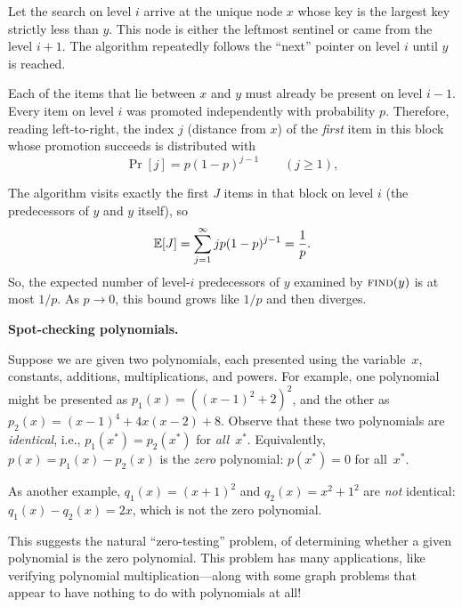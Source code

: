 \documentclass[11pt,addpoints,answers]{exam}
\begin{document}
\begin{questions}
\begin{parts}
    
    \begin{solution}
    Let the search on level \(i\) arrive at the unique node \(x\) whose key is the largest key strictly less than \(y\). This node is either the leftmost sentinel or came from the level \(i+1\).
    The algorithm repeatedly follows the “next'' pointer on level \(i\) until \(y\) is reached.
    
    Each of the items that lie between \(x\) and \(y\) must already be present on level \(i-1\). Every item on level \(i\) was promoted independently with probability \(p\). Therefore, reading left-to-right, the index \(j\) (distance from $x$) of the \emph{first} item in this block whose promotion succeeds is distributed with
    \[
        \Pr[j]=p(1-p)^{j-1}\qquad(j\ge 1),
    \]
    
    The algorithm visits exactly the first \(J\) items in that block on
    level \(i\) (the predecessors of \(y\) and \(y\) itself), so
    \[
        \operatorname*{\mathbb{E}}[J]=\sum_{j=1}^{\infty}jp(1-p)^{j-1}=\frac{1}{p}.
    \]
    So, the expected number of level-\(i\) predecessors of \(y\) examined by \(\textsc{find}(y)\) is at most \(1/p\).
    As \(p\to 0\), this bound grows like \(1/p\) and then diverges.
    \end{solution}
  \end{parts}

    \question \textbf{Spot-checking polynomials.}
  \nopagebreak

  Suppose we are given two polynomials, each presented using the variable~$x$, constants, additions, multiplications, and powers.
  For example, one polynomial might be presented as $p_1(x) = ((x - 1)^2 + 2)^2$, and the other as $p_2(x) = (x-1)^4 + 4x(x-2) + 8$.
  Observe that these two polynomials are \emph{identical}, i.e., $p_1(x^*)=p_2(x^*)$ for \emph{all}~$x^*$.
  Equivalently, $p(x) = p_1(x) - p_2(x)$ is the \emph{zero} polynomial: $p(x^*)=0$ for all~$x^*$.
  
  As another example, $q_1(x) = (x+1)^2$ and $q_2(x) = x^2 + 1^2$ are \emph{not} identical: $q_1(x)-q_2(x) = 2x$, which is not the zero polynomial.

  This suggests the natural ``zero-testing'' problem, of determining whether a given polynomial is the zero polynomial.
  This problem has many applications, like verifying polynomial multiplication---along with some graph problems that appear to have nothing to do with polynomials at all!


\end{questions}
\end{document}
